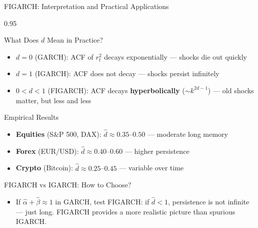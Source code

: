 \documentclass[9pt, aspectratio=169, t]{beamer}
\begin{document}
\begin{frame}{FIGARCH: Interpretation and Practical Applications}
    \begin{cminipage}{0.95\textwidth}
    {\footnotesize
        \begin{block}{What Does $d$ Mean in Practice?}
            \begin{itemize}\setlength{\itemsep}{0pt}
                \item \textbf{$d = 0$} (GARCH): ACF of $r_t^2$ decays exponentially --- shocks die out quickly
                \item \textbf{$d = 1$} (IGARCH): ACF does not decay --- shocks persist infinitely
                \item \textbf{$0 < d < 1$} (FIGARCH): ACF decays \textbf{hyperbolically} ($\sim k^{2d-1}$) --- old shocks matter, but less and less
            \end{itemize}
        \end{block}
        \begin{exampleblock}{Empirical Results}
            \begin{itemize}\setlength{\itemsep}{0pt}
                \item \textbf{Equities} (S\&P 500, DAX): $\hat{d} \approx 0.35$--$0.50$ --- moderate long memory
                \item \textbf{Forex} (EUR/USD): $\hat{d} \approx 0.40$--$0.60$ --- higher persistence
                \item \textbf{Crypto} (Bitcoin): $\hat{d} \approx 0.25$--$0.45$ --- variable over time
            \end{itemize}
        \end{exampleblock}
        \begin{alertblock}{FIGARCH vs IGARCH: How to Choose?}
            \begin{itemize}\setlength{\itemsep}{0pt}
                \item If $\hat{\alpha} + \hat{\beta} \approx 1$ in GARCH, test FIGARCH: if $\hat{d} < 1$, persistence is not infinite --- just long. FIGARCH provides a more realistic picture than spurious IGARCH.
            \end{itemize}
        \end{alertblock}
    }
    \end{cminipage}
\end{frame}
\end{document}
